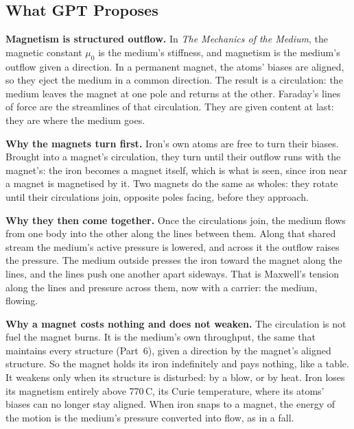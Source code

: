 \documentclass[11pt,a4paper]{article}
\begin{document}
\subsection*{What GPT Proposes}

\begin{hypbar}
\textbf{Magnetism is structured outflow.} In \emph{The Mechanics of the Medium}, the magnetic constant $\mu_0$ is the medium's stiffness, and magnetism is the medium's outflow given a direction.\footnotemark{} In a permanent magnet, the atoms' biases are aligned, so they eject the medium in a common direction. The result is a circulation: the medium leaves the magnet at one pole and returns at the other. Faraday's lines of force are the streamlines of that circulation. They are given content at last: they are where the medium goes.

\textbf{Why the magnets turn first.} Iron's own atoms are free to turn their biases. Brought into a magnet's circulation, they turn until their outflow runs with the magnet's: the iron becomes a magnet itself, which is what is seen, since iron near a magnet is magnetised by it. Two magnets do the same as wholes: they rotate until their circulations join, opposite poles facing, before they approach.

\textbf{Why they then come together.} Once the circulations join, the medium flows from one body into the other along the lines between them. Along that shared stream the medium's active pressure is lowered, and across it the outflow raises the pressure. The medium outside presses the iron toward the magnet along the lines, and the lines push one another apart sideways. That is Maxwell's tension along the lines and pressure across them, now with a carrier: the medium, flowing.

\textbf{Why a magnet costs nothing and does not weaken.} The circulation is not fuel the magnet burns. It is the medium's own throughput, the same that maintains every structure (Part~6), given a direction by the magnet's aligned structure. So the magnet holds its iron indefinitely and pays nothing, like a table. It weakens only when its structure is disturbed: by a blow, or by heat. Iron loses its magnetism entirely above 770\,\textdegree C, its Curie temperature, where its atoms' biases can no longer stay aligned. When iron snaps to a magnet, the energy of the motion is the medium's pressure converted into flow, as in a fall.
\end{hypbar}
\end{document}
